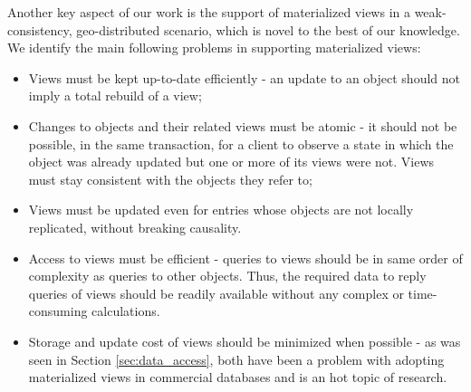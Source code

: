 Another key aspect of our work is the support of materialized views in a weak-consistency, geo-distributed scenario, which is novel to the best of our knowledge.
We identify the main following problems in supporting materialized views:
\begin{itemize}
	\item Views must be kept up-to-date efficiently - an update to an object should not imply a total rebuild of a view;
	\item Changes to objects and their related views must be atomic - it should not be possible, in the same transaction, for a client to observe a state in which the object was already updated but one or more of its views were not. Views must stay consistent with the objects they refer to;
	\item Views must be updated even for entries whose objects are not locally replicated, without breaking causality.
	\item Access to views must be efficient - queries to views should be in same order of complexity as queries to other objects.
	Thus, the required data to reply queries of views should be readily available without any complex or time-consuming calculations.
	\item Storage and update cost of views should be minimized when possible - as was seen in Section \ref{sec:data_access}, both have been a problem with adopting materialized views in commercial databases and is an hot topic of research.
	\end{itemize}

